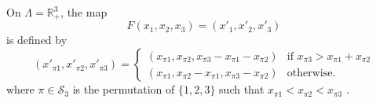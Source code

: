 On $\Lambda=\mathbb{R}^3_+$, the map
\[
F (x_1,x_2,x_3) = (x'_1,x'_2,x'_3)
\]
is defined by
\[
(x'_{\pi 1}, x'_{\pi 2}, x'_{\pi 3}) =
\begin{cases}
    (x_{\pi 1}, x_{\pi 2}, x_{\pi 3}-x_{\pi 1}-x_{\pi 2}) &\mbox{if }
	x_{\pi 3}>x_{\pi 1}+x_{\pi 2}\\
    (x_{\pi 1}, x_{\pi 2}-x_{\pi 1}, x_{\pi 3}-x_{\pi 2}) &\mbox{otherwise.}
\end{cases}
\]
where $\pi\in\mathcal{S}_3$ is the permutation of $\{1,2,3\}$ such that
$x_{\pi 1}<x_{\pi 2}<x_{\pi 3}$ \cite{2015_berthe_factor}.
